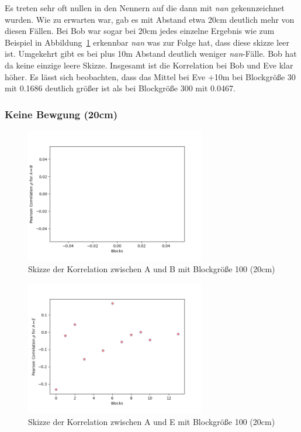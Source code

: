 \documentclass[12pt,a4paper]{article}
\begin{document}
Es treten sehr oft nullen in den Nennern auf die dann mit 
\textit{nan} gekennzeichnet wurden. Wie zu erwarten war, gab 
es mit Abstand etwa 20cm deutlich mehr von diesen Fällen. 
Bei Bob war sogar bei 20cm jedes einzelne Ergebnis wie 
zum Beispiel in Abbildung~\ref{fig:Label8} erkennbar \textit{nan}
was zur Folge hat, dass diese skizze leer ist. 
Umgekehrt gibt es bei plus 10m Abstand deutlich weniger
\textit{nan}-Fälle. Bob hat da keine einzige leere Skizze.
Insgesamt ist die Korrelation bei Bob und Eve klar höher.
Es lässt sich beobachten, dass das Mittel bei Eve +10m bei Blockgröße
30 mit 0.1686 deutlich größer ist als bei Blockgröße 300 mit 0.0467.

\newpage
\subsubsection*{Keine Bewgung (20cm)}


\begin{figure}[hbt!]
	\centering
		\includegraphics[width=0.7\textwidth ]
		{Bilder/a3-t3a-ob-block100-correlation-AB.png}
		\caption{Skizze der Korrelation zwischen A und B mit Blockgröße 100 (20cm)}
		\label{fig:Label8}
\end{figure}

\begin{figure}[hbt!]
	\centering
		\includegraphics[width=0.7\textwidth ]
		{Bilder/a3-t3a-ob-block100-correlation-AE.png}
		\caption{Skizze der Korrelation zwischen A und E mit Blockgröße 100 (20cm)}
		\label{fig:Label9}
\end{figure}
\clearpage
\end{document}
